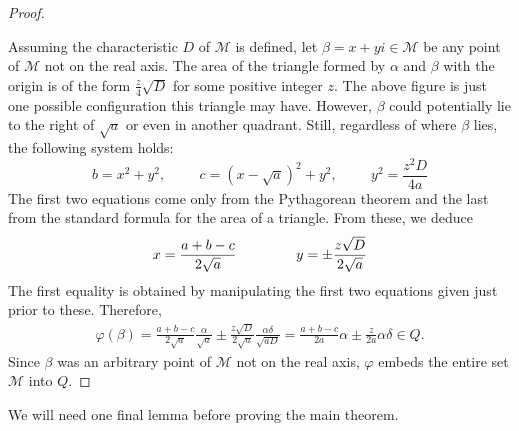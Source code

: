 \documentclass[10pt]{amsart}
\newcommand{\M}{\mathcal{M}}
\begin{document}
\begin{proof}
\begin{figure}[h]
\begin{center}
  \end{center}
  \end{figure}

Assuming the characteristic $D$ of $\M$ is defined, let $\beta = x + yi \in \M$ be any point of $\M$ not on the real axis.  The area of the triangle formed by $\alpha$ and $\beta$ with the origin is of the form $\frac{z}{4}\sqrt{D}$ for some positive integer $z$.  The above figure is just one possible configuration this triangle may have.  However, $\beta$ could potentially lie to the right of $\sqrt{a}$ or even in another quadrant.  Still, regardless of where $\beta$ lies, the following system holds:
$$
b = x^2 + y^2, \hspace{1cm} c = (x-\sqrt{a})^2 + y^2, \hspace{1cm} y^2 = \dfrac{z^2D}{4a}
$$
The first two equations come only from the Pythagorean theorem and the last from the standard formula for the area of a triangle.  From these, we deduce
\begin{align*}
x = \frac{a+b-c}{2\sqrt{a}} \hspace{1.5cm}
y = \pm \frac{z\sqrt{D}}{2\sqrt{a}}
\end{align*}
The first equality is obtained by manipulating the first two equations given just prior to these.  Therefore,
\begin{align*}
\varphi(\beta) = \frac{a+b-c}{2\sqrt{a}}\frac{\alpha}{\sqrt{a}} \pm \frac{z\sqrt{D}}{2\sqrt{a}}\frac{\alpha \delta}{\sqrt{aD}} = \frac{a+b-c}{2a}\alpha \pm \frac{z}{2a} \alpha \delta \in Q.
\end{align*}
Since $\beta$ was an arbitrary point of $\M$ not on the real axis, $\varphi$ embeds the entire set $\M$ into $Q$.
\end{proof}

We will need one final lemma before proving the main theorem.
\end{document}
